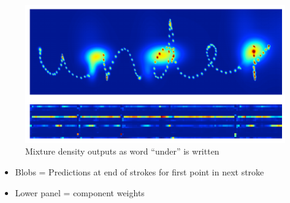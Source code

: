 \documentclass[10pt,xcolor=dvipsnames]{beamer}
\begin{document}
\begin{frame}
  \begin{figure}
    \centering
    \includegraphics[width=.75\linewidth]{fig/fig10.png}
    \caption{Mixture density outputs as word ``under'' is written}
    \label{fig:fig10}
  \end{figure}
  \begin{itemize}
  \item Blobs = Predictions at end of strokes for first point in next stroke
  \item Lower panel = component weights
  \end{itemize}
\end{frame}
\end{document}
